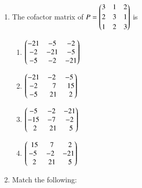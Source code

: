 \documentclass[journal]{IEEEtran}
\begin{document}
\begin{enumerate}[leftmargin=0pt]
\item The cofactor matrix of 
$\displaystyle P=\begin{pmatrix}3 & 1 & 2\\[2pt] 2 & 3 & 1\\[2pt] 1 & 2 & 3\end{pmatrix}$ is
\begin{multicols}{2}
\begin{enumerate}[label=(\Alph*),itemsep=2pt,topsep=2pt]
  \item $\begin{pmatrix}-21 & -5 & -2\\ -2 & -21 & -5\\ -5 & -2 & -21\end{pmatrix}$
  \item $\begin{pmatrix}-21 & -2 & -5\\ -2 & \;\;\,7 & \;\,15\\ -5 & \;\,21 & \;\,2\end{pmatrix}$
  \item $\begin{pmatrix}-5 & -2 & -21\\ -15 & -7 & -2\\ \;\,2 & \;\,21 & \;\,5\end{pmatrix}$
  \item $\begin{pmatrix}\;\,15 & \;\,7 & \;\,2\\ -5 & -2 & -21\\ \;\,2 & \;\,21 & \;\,5\end{pmatrix}$
\end{enumerate}
\end{multicols}
\hfill{}

\setcounter{enumi}{43}
\item Match the following:



\end{enumerate}
\end{document}
